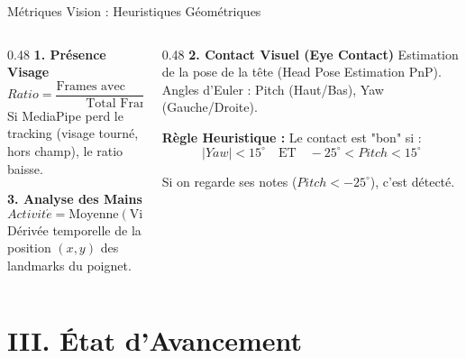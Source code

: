 \documentclass[10pt,aspectratio=169]{beamer}
\begin{document}
\begin{frame}{Métriques Vision : Heuristiques Géométriques}
    \begin{columns}[T]
        \begin{column}{0.48\textwidth}
            \textbf{\textcolor{primary}{1. Présence Visage}}
            \footnotesize
            $$ Ratio = \frac{\text{Frames avec Landmarks}}{\text{Total Frames}} $$
            Si MediaPipe perd le tracking (visage tourné, hors champ), le ratio baisse.
            
            \vspace{0.5cm}
            \textbf{\textcolor{primary}{3. Analyse des Mains}}
            \footnotesize
            $$ Activit\acute{e} = \text{Moyenne}(\text{Vitesse Poignets}) $$
            Dérivée temporelle de la position $(x,y)$ des landmarks du poignet.
        \end{column}
        \begin{column}{0.48\textwidth}
            \textbf{\textcolor{primary}{2. Contact Visuel (Eye Contact)}}
            \footnotesize
            Estimation de la pose de la tête (Head Pose Estimation PnP).
            Angles d'Euler : Pitch (Haut/Bas), Yaw (Gauche/Droite).
            
            \begin{tcolorbox}[colback=secondary, colframe=primary!20]
                \textbf{Règle Heuristique :}
                Le contact est "bon" si :
                $$ |Yaw| < 15^\circ \quad \text{ET} \quad -25^\circ < Pitch < 15^\circ $$
            \end{tcolorbox}
            Si on regarde ses notes ($Pitch < -25^\circ$), c'est détecté.
        \end{column}
    \end{columns}
\end{frame}

\section{III. État d'Avancement}
\end{document}
